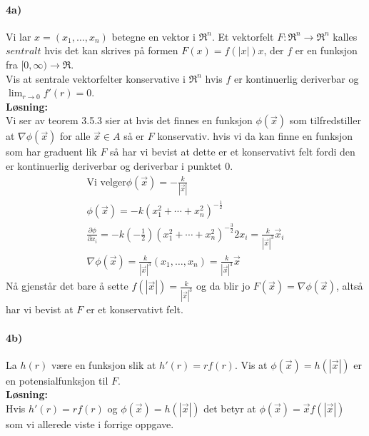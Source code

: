 \documentclass[11pt, A4paper,norsk]{article}
\begin{document}
		\paragraph{4a)}
			\begin{flushleft}
Vi lar $x = (x_1, \dots, x_n)$ betegne en vektor i $\Re^n$. Et vektorfelt $F : \Re^n \rightarrow \Re^n$ kalles $sentralt$ hvis det kan skrives på formen $F(x) = f(|x|)x$, der $f$ er en funksjon fra $[0, \infty) \rightarrow \Re$. \\
Vis at sentrale vektorfelter konservative i $\Re^n$ hvis $f$ er kontinuerlig deriverbar og $\lim_{r \rightarrow 0} f'(r) = 0$. \\
\vspace{1mm}
\textbf{Løsning:} \\
\vspace{1mm}
Vi ser av teorem 3.5.3 sier at hvis det finnes en funksjon $\phi(\vec{x})$ som tilfredstiller at $\nabla \phi(\vec{x})$ for alle $\vec{x} \in A$ så er $F$ konservativ. hvis vi da kan finne en funksjon som har graduent lik $F$ så har vi bevist at dette er et konservativt felt fordi den er kontinuerlig deriverbar og deriverbar i punktet $0$.
				\begin{align}
\text{Vi velger} \phi (\vec{x}) = - \frac{k}{|\vec{x}|} \nonumber \\
\phi (\vec{x}) = -k(x_1^2 + \cdots + x_n^2)^{-\frac{1}{2}} \nonumber \\
\frac{\partial \phi}{\partial x_i} = -k(- \frac{1}{2})(x_1^2 + \cdots + x_n^2)^{- \frac{3}{2}}2x_i = \frac{k}{|\vec{x}|^3}\vec{x}_i \nonumber \\
\nabla \phi (\vec{x}) = \frac{k}{|\vec{x}|^3}(x_1, \dots , x_n) = \frac{k}{|\vec{x}|^3}\vec{x} \nonumber
				\end{align}
Nå gjenstår det bare å sette $f(|\vec{x}|) = \frac{k}{|\vec{x}|^3}$ og da blir jo $F(\vec{x}) = \nabla \phi(\vec{x})$, altså har vi bevist at $F$ er et konservativt felt.
			\end{flushleft}
		\paragraph{4b)}
		\begin{flushleft}
La $h(r)$ være en funksjon slik at $h'(r) = rf(r)$. Vis at $\phi(\vec{x}) = h(|\vec{x}|)$ er en potensialfunksjon til $F$. \\
\vspace{1mm}
\textbf{Løsning:} \\
\vspace{1mm}
Hvis $h'(r) = rf(r)$ og $\phi(\vec{x}) = h(|\vec{x}|)$ det betyr at
$\phi(\vec{x}) = \vec{x}f(|\vec{x}|)$ som vi allerede viste i forrige oppgave.
		\end{flushleft}
\end{document}
